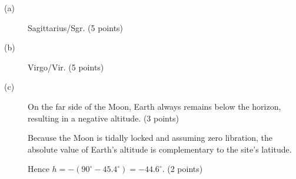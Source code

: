 \begin{description}
\item[(a)] Sagittarius/Sgr. \hfill(5 points)

\item[(b)] Virgo/Vir. \hfill(5 points)

\item[(c)] On the far side of the Moon, Earth always remains below the
  horizon, resulting in a negative altitude. \hfill(3 points)

  Because the Moon is tidally locked and assuming zero libration, the
  absolute value of Earth's altitude is complementary to the site's latitude.

  Hence $h = -(90^\circ - 45.4^\circ) = -44.6^\circ$. \hfill(2 points)
\end{description}
